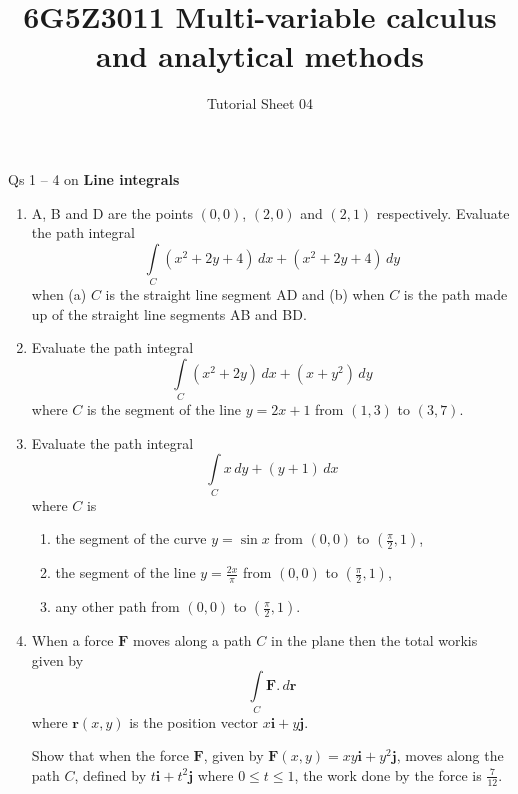 \documentclass[20pt, a4paper]{extarticle}
\date{}
\renewcommand{\b}{\mathbf}
\begin{document}
\title{6G5Z3011 Multi-variable calculus and analytical methods}
\author{Tutorial Sheet 04}
\maketitle

Qs 1 -- 4 on \textbf{Line integrals}
\begin{enumerate}
    \item
    A, B and D are the points $(0,0)$, $(2,0)$ and $(2,1)$ respectively. Evaluate the path integral
    $$\int\limits_C (x^2 + 2y + 4) \, dx + (x^2 + 2y +4) \, dy$$
    when (a) $C$ is the straight line segment AD and (b) when $C$ is the path made up of the straight line segments AB and BD.
    \item
    Evaluate the path integral
    $$\int\limits_C (x^2 + 2y) \, dx + (x + y^2) \, dy $$
    where $C$ is the segment of the line $y=2x+1$ from $(1,3)$ to $(3,7)$.
    \item
    Evaluate the path integral
    $$\int\limits_C x \, dy + (y + 1) \, dx $$
    where $C$ is
    \begin{enumerate}
    \item
    the segment of the curve $y=\sin x$ from $(0,0)$ to $(\frac{\pi}{2},1)$,
    \item
    the segment of the line $y=\frac{2x}{\pi}$ from $(0,0)$ to $(\frac{\pi}{2},1)$,
    \item
    any other path from $(0,0)$ to $(\frac{\pi}{2},1)$.
    \end{enumerate}
    \item
    When a force $\b{F}$ moves along a path $C$ in the plane then the total workis given by
    $$\int\limits_C \b{F} . \, d \b{r}$$
    where $\b{r}(x,y)$ is the position vector $x \b{i} + y \b{j}$.
    
    Show that when the force $\b{F}$, given by $\b{F}(x,y) = xy \b{i} + y^2 \b{j}$, moves along the path $C$, defined by $t \b{i} + t^2 \b{j}$ where $0 \leq t \leq 1$, the work done by the force is $\frac{7}{12}$.
    \end{enumerate}
\end{document}
